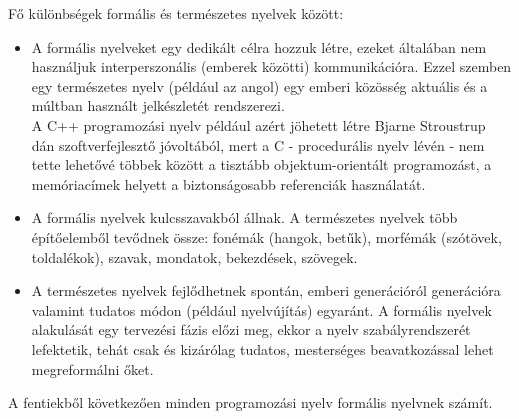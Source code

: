 \documentclass[tocnopagenum]{thesis-ekf}
\theoremstyle{definition}
\theoremstyle{remark}
\begin{document}
	Fő különbségek formális és természetes nyelvek között:
	\begin{itemize}
		\item A formális nyelveket egy dedikált célra hozzuk létre, ezeket általában nem használjuk interperszonális (emberek közötti) kommunikációra. Ezzel szemben egy természetes nyelv (például az angol) egy emberi közösség aktuális és a múltban használt jelkészletét rendszerezi.\\
		A C++ programozási nyelv például azért jöhetett létre Bjarne Stroustrup dán szoftverfejlesztő jóvoltából, mert a C - procedurális nyelv lévén - nem tette lehetővé többek között a tisztább objektum-orientált programozást, a memóriacímek helyett a biztonságosabb referenciák használatát. \cite{cpplang1}
		\item A formális nyelvek kulcsszavakból állnak. A természetes nyelvek több építőelemből tevődnek össze: fonémák (hangok, betűk), morfémák (szótövek, toldalékok), szavak, mondatok, bekezdések, szövegek.
		\item A természetes nyelvek fejlődhetnek spontán, emberi generációról generációra valamint tudatos módon (például nyelvújítás) egyaránt. A formális nyelvek alakulását egy tervezési fázis előzi meg, ekkor a nyelv szabályrendszerét lefektetik, tehát csak és kizárólag tudatos, mesterséges beavatkozással lehet megreformálni őket.
	\end{itemize} \cite{langvid1} \cite{langvid2}

	A fentiekből következően minden programozási nyelv formális nyelvnek számít. 
\end{document}
